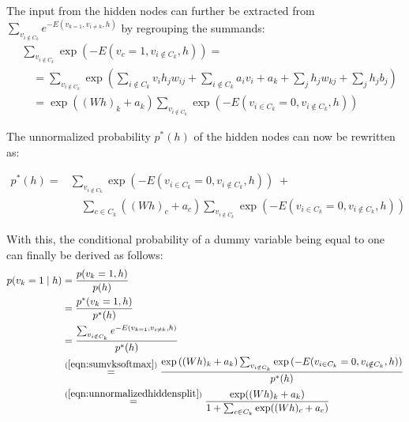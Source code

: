 \documentclass[12pt]{article}
\begin{document}
The input from the hidden nodes can further be extracted from $ \sum_{v_{i \notin C_k}} e^{-E(v_{k=1}, v_{i \neq k}, h)}$ by regrouping the summands:
\begin{align}
&\sum_{v_{i \notin C_k}} \exp ( - E(v_c = 1, v_{i \notin C_k},  h)) = \nonumber \\
&\quad = \sum_{v_{i \notin C_k}} \exp \left( \sum_{i \notin C_k} v_i h_j w_{ij} + \sum_{i \notin C_k} a_i v_i + a_k  + \sum_j h_j w_{kj} +\sum_j h_j b_j \right) \nonumber \\
&\quad = \exp \left( (Wh)_k + a_k \right) \sum_{v_{i \notin C_k}} \exp \left(-E(v_{i \in C_k} = 0, v_{i \notin C_k}, h) \right)
\label{eqn:sumvksoftmax}
\end{align}

The unnormalized probability $p^*(h)$ of the hidden nodes can now be rewritten as:

\begin{align}
p^*(h) =& \sum_{v_{i \notin C_k}} \exp (-E(v_{i \in C_k} = 0, v_{i \notin C_k}, h)) \; + \nonumber \\ 
&\quad  \sum_{c \in C_k} \left( (Wh)_c + a_c \right) \sum_{v_{i \notin C_k}} \exp \left(-E(v_{i \in C_k} = 0, v_{i \notin C_k}, h) \right)
\label{eqn:unnormalizedhiddensplit}
\end{align}

With this, the conditional probability of a dummy variable being equal to one can finally be derived as follows:
\begin{align*}
p(v_k = 1 \mid h) &= \frac{p(v_k = 1, h)}{p(h)} \\
  &= \frac{p^*(v_k = 1, h)}{p^*(h)}\\
  &= \frac{\sum_{v_{i \notin C_k}} e^{-E(v_{k=1}, v_{i \neq k}, h)}}{p^*(h)} \\
 &\stackrel{(\ref{eqn:sumvksoftmax})}{=} \frac{\exp \left( (Wh)_k + a_k \right) \sum_{v_{i \notin C_k}} \exp \left(-E(v_{i \in C_k} = 0, v_{i \notin C_k}, h) \right)}{p^*(h)}\\
&\stackrel{(\ref{eqn:unnormalizedhiddensplit})}{=} \frac{\exp((Wh)_k + a_k)}{1 + \sum_{c \in C_k} \exp ((Wh)_c + a_c)}
\end{align*}
\end{document}
